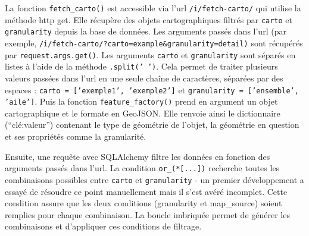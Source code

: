\sloppy La fonction \texttt{fetch\_carto()} est accessible via l'\acrshort{url} \texttt{/i/fetch-carto/} qui utilise la méthode \acrshort{http} \acrshort{get}. Elle récupère des objets cartographiques filtrés par \texttt{carto} et \texttt{granularity} depuis la base de données. Les arguments passés dans l'\acrshort{url} (par exemple, \texttt{/i/fetch-carto/?carto=example\&granularity=detail)} sont récupérés par \texttt{request.args.get()}. Les arguments \texttt{carto} et \texttt{granularity} sont séparés en listes à l'aide de la méthode \texttt{.split(' ')}. Cela permet de traiter plusieurs valeurs passées dans l'\acrshort{url} en une seule chaîne de caractères, séparées par des espaces : \texttt{carto = ['exemple1', 'exemple2']} et \texttt{granularity = ['ensemble', 'aile']}. Puis la fonction \texttt{feature\_factory()} prend en argument un objet cartographique et le formate en GeoJSON. Elle renvoie ainsi le dictionnaire (\enquote{clé:valeur}) contenant le type de géométrie de l'objet, la géométrie en question et ses propriétés comme la granularité. 

Ensuite, une requête avec SQLAlchemy filtre les données en fonction des arguments passés dans l'\acrshort{url}. La condition \texttt{or\_(*[...])} recherche toutes les combinaisons possibles entre \texttt{carto} et \texttt{granularity} - un premier développement a essayé de résoudre ce point manuellement mais il s'est avéré incomplet. Cette condition assure que les deux conditions (granularity et map\_source) soient remplies pour chaque combinaison. La boucle imbriquée permet de générer les combinaisons et d'appliquer ces conditions de filtrage.

